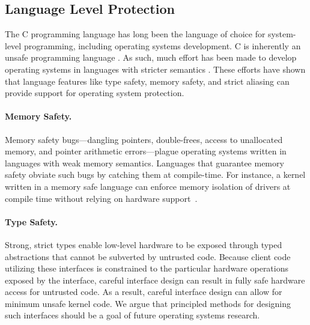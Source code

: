 \subsection{Language Level Protection}

The C programming language has long been the language of choice for system-level
programming, including operating systems development. C is inherently an unsafe
programming language \cite{kint:osdi2012, undefined:apsys2012}. As such, much
effort has been made to develop operating systems in languages with stricter
semantics \cite{singularity:sigops, house:icfp2005, unikernels:2013}. These
efforts have shown that language features like type safety, memory safety, and
strict aliasing can provide support for operating system protection.

\paragraph{Memory Safety.}
Memory safety bugs---dangling pointers, double-frees, access to unallocated
memory, and pointer arithmetic errors---plague operating systems written in
languages with weak memory semantics. Languages that guarantee memory safety
obviate such bugs by catching them at compile-time. For instance, a kernel
written in a memory safe language can enforce memory isolation of drivers at
compile time without relying on hardware support~\cite{spin:sosp}.

\paragraph{Type Safety.}
Strong, strict types enable low-level hardware to be exposed through typed
abstractions that cannot be subverted by untrusted code. Because client code
utilizing these interfaces is constrained to the particular hardware operations
exposed by the interface, careful interface design can result in fully safe
hardware access for untrusted code. As a result, careful interface design can
allow for minimum unsafe kernel code. We argue that principled methods for
designing such interfaces should be a goal of future operating systems research.

